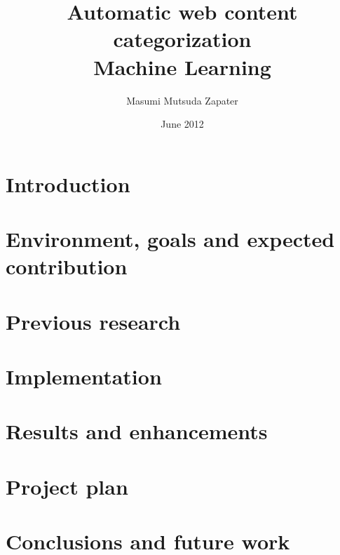\documentclass[12pt, a4paper , titlepage]{report}
\author{Masumi Mutsuda Zapater}
\title{Automatic web content categorization \\ Machine Learning}
\date{June 2012}
\begin{document}
 

\newpage
\thispagestyle{empty}
\mbox{}



\newpage
\thispagestyle{empty}
\mbox{}

\maketitle

\newpage
\thispagestyle{empty}
\mbox{}



\newpage
\thispagestyle{empty}
\mbox{}

\tableofcontents


\chapter{Introduction}


\chapter[Environment and goals]{Environment, goals and expected contribution}
\label{chap:flowsight}


\newpage
\thispagestyle{empty}
\mbox{}
\newpage
\thispagestyle{empty}
\mbox{}

\chapter{Previous research}
\label{chap:research}


\newpage
\thispagestyle{empty}
\mbox{}

\chapter{Implementation}
\label{chap:implementation}


\chapter[Results \& enhancements]{Results and enhancements}
\label{chap:enhancements}



\newpage
\thispagestyle{empty}
\mbox{}
\newpage
\thispagestyle{empty}
\mbox{}

\chapter{Project plan}
\label{chap:plan}



\chapter[Conclusions]{Conclusions and future work}
\label{chap:conclusions}


\cleardoublepage
{}
{}


\cleardoublepage
{}
{} 
\listoffigures
\end{document}
